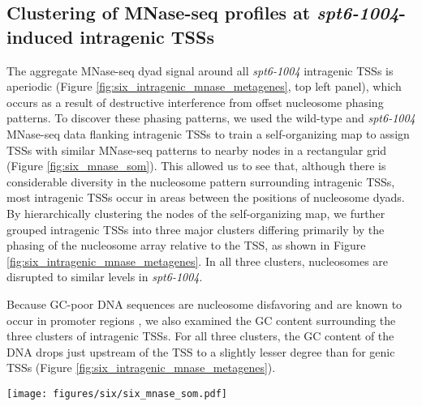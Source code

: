 \subsection{Clustering of MNase-seq profiles at \textit{spt6-1004}-induced intragenic TSSs}

The aggregate MNase-seq dyad signal around all \textit{spt6-1004} intragenic TSSs is aperiodic (Figure \ref{fig:six_intragenic_mnase_metagenes}, top left panel), which occurs as a result of destructive interference from offset nucleosome phasing patterns.
To discover these phasing patterns, we used the wild-type and \textit{spt6-1004} MNase-seq data flanking intragenic TSSs to train a self-organizing map to assign TSSs with similar MNase-seq patterns to nearby nodes in a rectangular grid (Figure \ref{fig:six_mnase_som}).
This allowed us to see that, although there is considerable diversity in the nucleosome pattern surrounding intragenic TSSs, most intragenic TSSs occur in areas between the positions of nucleosome dyads.
By hierarchically clustering the nodes of the self-organizing map, we further grouped intragenic TSSs into three major clusters differing primarily by the phasing of the nucleosome array relative to the TSS, as shown in Figure \ref{fig:six_intragenic_mnase_metagenes}.
In all three clusters, nucleosomes are disrupted to similar levels in \textit{spt6-1004}.

Because GC-poor DNA sequences are nucleosome disfavoring and are known to occur in promoter regions \citep{iyer1995,kaplan2008,tillo2009,zhang2009}, we also examined the GC content surrounding the three clusters of intragenic TSSs.
For all three clusters, the GC content of the DNA drops just upstream of the TSS to a slightly lesser degree than for genic TSSs (Figure \ref{fig:six_intragenic_mnase_metagenes}).

\begin{sidewaysfigure}
    \centering
    \texttt{[image: figures/six/six\_mnase\_som.pdf]}
    \caption[Average MNase-seq dyad signal around all \textit{spt6-1004}-induced intragenic TSSs, grouped by a self-organizing map of the MNase-seq signal.]{Average MNase-seq dyad signal around all \textit{spt6-1004}-induced intragenic TSSs, grouped by assignment to nodes of a 6x8 super-organizing map (SOM). The number of TSSs assigned to each node is shown in the upper right of each panel, and is shaded by the node's assignment to a cluster determined by agglomerative hierarchical clustering of the nodes. The solid line and shading are the median and inter-quartile range of the mean spike-in normalized coverage over two replicates (\textit{spt6-1004}) or one experiment (wild-type), in non-overlapping 5 bp bins.}
    \label{fig:six_mnase_som}
\end{sidewaysfigure}

